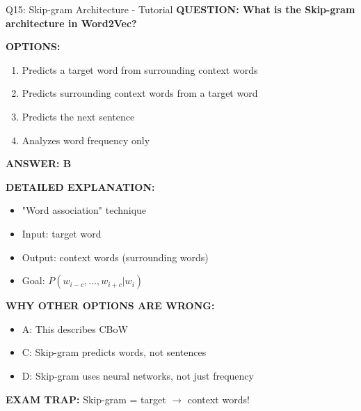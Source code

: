 \documentclass[8pt]{beamer}
\begin{document}
	\begin{frame}{Q15: Skip-gram Architecture - Tutorial}
		\fontsize{6.5}{7.5}\selectfont
		\textbf{QUESTION: What is the Skip-gram architecture in Word2Vec?}
		
		\vspace{0.1cm}
		\textbf{OPTIONS:}
		\begin{enumerate}
			\item Predicts a target word from surrounding context words
			\item Predicts surrounding context words from a target word
			\item Predicts the next sentence
			\item Analyzes word frequency only
		\end{enumerate}
		
		\vspace{0.1cm}
		\textcolor{myblue}{\textbf{ANSWER: B}}
		
		\vspace{0.1cm}
		\textbf{DETAILED EXPLANATION:}
		\begin{itemize}
			\item "Word association" technique
			\item Input: target word
			\item Output: context words (surrounding words)
			\item Goal: $P(w_{i-c}, ..., w_{i+c} | w_i)$
		\end{itemize}
		
		\vspace{0.1cm}
		\textcolor{myred}{\textbf{WHY OTHER OPTIONS ARE WRONG:}}
		\begin{itemize}
			\item \textcolor{myred}{A:} This describes CBoW
			\item \textcolor{myred}{C:} Skip-gram predicts words, not sentences
			\item \textcolor{myred}{D:} Skip-gram uses neural networks, not just frequency
		\end{itemize}
		
		\textcolor{myred}{\textbf{EXAM TRAP:}} Skip-gram = \textcolor{myblue}{target $\to$ context} words!
	\end{frame}
	
\end{document}
